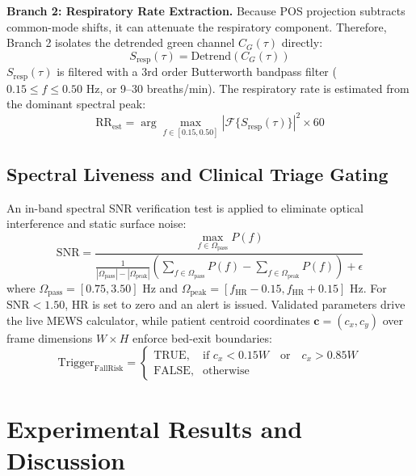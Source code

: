 \documentclass[conference]{IEEEtran}
\begin{document}
\textbf{Branch 2: Respiratory Rate Extraction.} Because POS projection subtracts common-mode shifts, it can attenuate the respiratory component. Therefore, Branch 2 isolates the detrended green channel $C_G(\tau)$ directly:
\begin{equation}
    S_{\text{resp}}(\tau) = \text{Detrend}(C_G(\tau))
\end{equation}
$S_{\text{resp}}(\tau)$ is filtered with a 3rd order Butterworth bandpass filter ($0.15 \le f \le 0.50\text{ Hz}$, or 9--30 breaths/min). The respiratory rate is estimated from the dominant spectral peak:
\begin{equation}
    \text{RR}_{\text{est}} = \arg\max_{f \in [0.15, 0.50]} |\mathcal{F}\{S_{\text{resp}}(\tau)\}|^2 \times 60
\end{equation}

\subsection{Spectral Liveness and Clinical Triage Gating}
An in-band spectral SNR verification test is applied to eliminate optical interference and static surface noise:
\begin{equation}
    \text{SNR} = \frac{\max_{f \in \Omega_{\text{pass}}} P(f)}{\frac{1}{|\Omega_{\text{pass}}| - |\Omega_{\text{peak}}|} \left( \sum_{f \in \Omega_{\text{pass}}} P(f) - \sum_{f \in \Omega_{\text{peak}}} P(f) \right) + \epsilon}
\end{equation}
where $\Omega_{\text{pass}} = [0.75, 3.50]\text{ Hz}$ and $\Omega_{\text{peak}} = [f_{\text{HR}}-0.15, f_{\text{HR}}+0.15]\text{ Hz}$. For $\text{SNR} < 1.50$, HR is set to zero and an alert is issued. Validated parameters drive the live MEWS calculator, while patient centroid coordinates $\mathbf{c} = (c_x, c_y)$ over frame dimensions $W \times H$ enforce bed-exit boundaries:
\begin{equation}
    \text{Trigger}_{\text{FallRisk}} = 
    \begin{cases} 
      \text{TRUE}, & \text{if } c_x < 0.15 W \quad \text{or} \quad c_x > 0.85 W \\
      \text{FALSE}, & \text{otherwise}
    \end{cases}
\end{equation}

\section{Experimental Results and Discussion}
\end{document}
